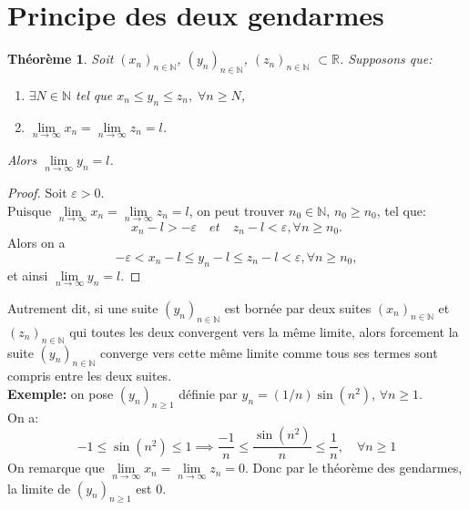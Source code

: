 \documentclass[oneside,12pt,french,table]{book}
\theoremstyle{definition}
\theoremstyle{plain}
\newtheorem{theorem}[definition]{Théorème}
\theoremstyle{remark}
\newcommand{\Nn}{{\mathbb{N}}}
\newcommand{\Rr}{{\mathbb{R}}}
\begin{document}
\section{Principe des deux gendarmes}
\begin{theorem}
    Soit $(x_n)_{n\in\Nn}$, $(y_n)_{n\in\Nn}$, $(z_n)_{n\in\Nn}$ $\subset \Rr$. Supposons que:
\begin{enumerate}
    \item $\exists N \in \Nn$ tel que $x_n\leq y_n\leq z_n, \; \forall n\geq N$,
    \item $\underset{n\rightarrow\infty}\lim x_n=\underset{n\rightarrow\infty}\lim z_n=l$.
\end{enumerate}
Alors $\underset{n\rightarrow\infty}\lim y_n=l$.

\end{theorem}

\begin{proof}
    Soit $\varepsilon>0$.
\\Puisque $\underset{n\rightarrow\infty}\lim x_n=\underset{n\rightarrow\infty}\lim z_n=l$, on peut trouver $n_0\in\Nn$, $n_0\geq n_0$, tel que:
\begin{equation*}
    x_n-l>-\varepsilon \quad et \quad z_n-l<\varepsilon, \forall n \geq n_0.
\end{equation*}
Alors on a 
\begin{equation*}
    -\varepsilon<x_n-l\leq y_n-l \leq z_n-l < \varepsilon, \forall n \geq n_0,
\end{equation*}
et ainsi $\underset{n\rightarrow\infty}\lim y_n=l.  $
\end{proof}



Autrement dit, si une suite $(y_n)_{n\in\Nn}$ est bornée par deux suites $(x_n)_{n\in\Nn}$ et $(z_n)_{n\in\Nn}$ qui toutes les deux convergent vers la même limite, alors forcement la suite $(y_n)_{n\in\Nn}$ converge vers cette même limite comme tous ses termes sont compris entre les deux suites.
\\\textbf{Exemple:} on pose $(y_n)_{n\geq1}$ définie par $y_n=(1/n)\sin(n^2)$, $\forall n \geq1$. 
\\On a:
\begin{equation*}
    -1\leq \sin(n^2)\leq1 \implies \frac{-1}{n} \leq \frac{\sin(n^2)}{n}\leq \frac{1}{n} , \quad \forall n \geq1
\end{equation*}
On remarque que $\underset{n\rightarrow\infty}\lim x_n=\underset{n\rightarrow\infty}\lim z_n=0$.
Donc par le théorème des gendarmes, la limite de $(y_n)_{n\geq1}$ est 0. \\
\end{document}
